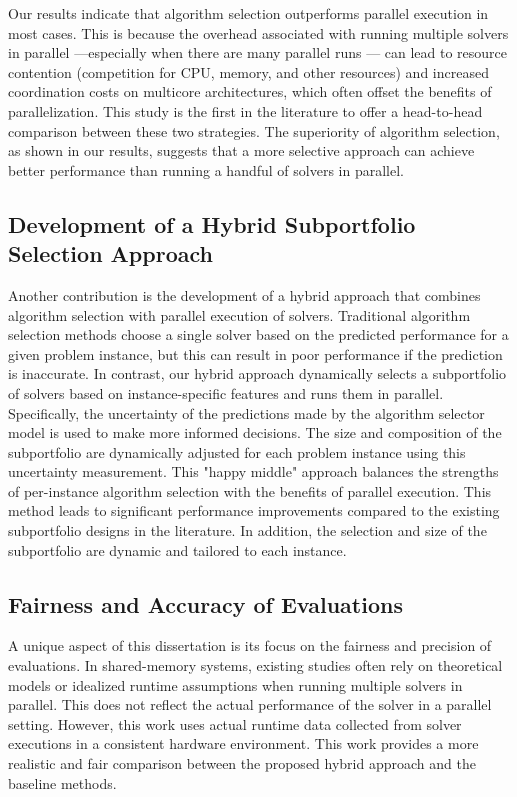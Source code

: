Our results indicate that algorithm selection outperforms parallel execution in most cases. This is because the overhead associated with running multiple solvers in parallel —especially when there are many parallel runs — can lead to resource contention (competition for CPU, memory, and other resources) and increased coordination costs on multicore architectures, which often offset the benefits of parallelization. This study is the first in the literature to offer a head-to-head comparison between these two strategies. The superiority of algorithm selection, as shown in our results, suggests that a more selective approach can achieve better performance than running a handful of solvers in parallel.

\subsection{Development of a Hybrid Subportfolio Selection Approach}
Another contribution is the development of a hybrid approach that combines algorithm selection with parallel execution of solvers. Traditional algorithm selection methods choose a single solver based on the predicted performance for a given problem instance, but this can result in poor performance if the prediction is inaccurate. In contrast, our hybrid approach dynamically selects a subportfolio of solvers based on instance-specific features and runs them in parallel. Specifically, the uncertainty of the predictions made by the algorithm selector model is used to make more informed decisions. The size and composition of the subportfolio are dynamically adjusted for each problem instance using this uncertainty measurement. This "happy middle" approach balances the strengths of per-instance algorithm selection with the benefits of parallel execution. This method leads to significant performance improvements compared to the existing subportfolio designs in the literature. In addition, the selection and size of the subportfolio are dynamic and tailored to each instance.

\subsection{Fairness and Accuracy of Evaluations}
A unique aspect of this dissertation is its focus on the fairness and precision of evaluations. In shared-memory systems, existing studies often rely on theoretical models or idealized runtime assumptions when running multiple solvers in parallel. This does not reflect the actual performance of the solver in a parallel setting. However, this work uses actual runtime data collected from solver executions in a consistent hardware environment. This work provides a more realistic and fair comparison between the proposed hybrid approach and the baseline methods.

